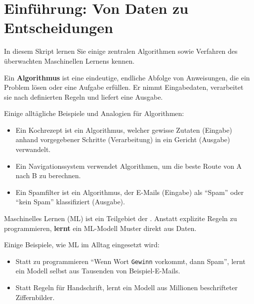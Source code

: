 \chapter{Einführung: Von Daten zu Entscheidungen}
\label{chap:einfuehrung}

In diesem Skript lernen Sie einige zentralen Algorithmen sowie Verfahren des überwachten Maschinellen Lernens kennen.

\begin{mydefinition}[Algorithmus]
Ein \textbf{Algorithmus} ist eine eindeutige, endliche Abfolge von Anweisungen, die ein Problem lösen oder eine Aufgabe erfüllen. Er nimmt Eingabedaten, verarbeitet sie nach definierten Regeln und liefert eine Ausgabe.
\end{mydefinition}

\begin{myexample}
Einige alltägliche Beispiele und Analogien für Algorithmen:
\begin{itemize}
    \item Ein Kochrezept ist ein Algorithmus, welcher gewisse Zutaten (Eingabe) anhand vorgegebener Schritte (Verarbeitung) in ein Gericht (Ausgabe) verwandelt.
    \item Ein Navigationssystem verwendet Algorithmen, um die beste Route von A nach B zu berechnen.
    \item Ein Spamfilter ist ein Algorithmus, der E-Mails (Eingabe) als \enquote{Spam} oder \enquote{kein Spam} klassifiziert (Ausgabe).
\end{itemize}
\end{myexample}

\begin{mydefinition}[\acrfull{ML}]
Maschinelles Lernen (\gls{ML}) ist ein Teilgebiet der .
Anstatt explizite Regeln zu programmieren, \textbf{lernt} ein \gls{ML}-Modell
Muster direkt aus Daten.
\end{mydefinition}

\begin{myexample}
    Einige Beispiele, wie \gls{ML} im Alltag eingesetzt wird:
\begin{itemize}
    \item Statt zu programmieren \enquote{Wenn Wort \texttt{Gewinn} vorkommt, dann Spam},
          lernt ein Modell selbst aus Tausenden von Beispiel-E-Mails.
    \item Statt Regeln für Handschrift, lernt ein Modell aus Millionen beschrifteter Ziffernbilder.
\end{itemize}
\end{myexample}


